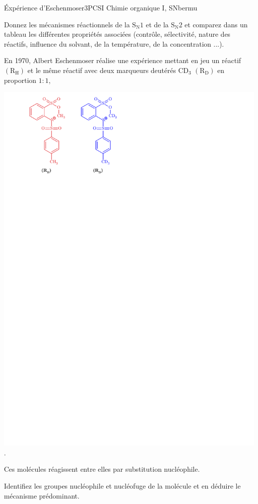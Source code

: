 
\begin{exercise}{\'Expérience d'Eschenmoser}{3}{PCSI}
{Chimie organique I, SN}{bermu}

\begin{questions}
\questioncours Donnez les mécanismes réactionnels de la $\mathrm{S_N1}$ et de la $\mathrm{S_N2}$ et comparez dans un tableau les différentes propriétés associées (contrôle, sélectivité, nature des réactifs, influence du solvant, de la température, de la concentration ...).

\begin{EnvUplevel}
    En 1970, Albert Eschenmoser réalise une expérience mettant en jeu un réactif $\boldsymbol{\mathrm{(R_H)}}$ et le même réactif avec deux marqueurs deutérés $\mathrm{CD_3}$ $\boldsymbol{\mathrm{(R_D)}}$ en proportion $1:1$,
    \begin{center}
        \includegraphics[scale=1.]{chimiePC/orga/eschenmoser.pdf}.
    \end{center}
    Ces molécules réagissent entre elles par substitution nucléophile.
\end{EnvUplevel}
\question Identifiez les groupes nucléophile et nucléofuge de la molécule et en déduire le mécanisme prédominant.


\end{questions}
\end{exercise}
